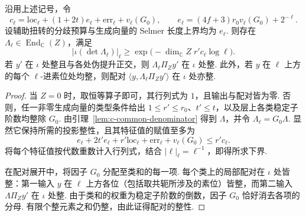 \begin{lemma}[分母算子的行列式与整配对]
\label{lem:c-clearing-determinant}
\emitthmsource
沿用上述记号，令
\begin{equation}
 c_\ell=\mathrm{loc}_\ell+(1+2t)e_\ell+\mathrm{err}_\ell+v_\ell(G_0),
 \qquad e_\ell=(4f+3)r_0v_\ell(G_0)+2^{-\ell}.
\label{eq:c-clearing-determinant}
\end{equation}
设辅助扭转的分歧预算与生成向量的 Selmer 长度上界均为 $e_\ell$.
则存在 $\Lambda_\ell\in\operatorname{End}_{\mathbb C}(Z)$，满足
\[
 |\iota(\det\Lambda_\ell)|_\ell
 \ge\exp\bigl(-\dim_{\mathbb C}Z\;r'c_\ell\log\ell\bigr).
\]
若 $y'$ 在 $\iota$ 处整且与各处伪提升正交，则 $\Lambda_\ell\Pi_Zy'$ 在 $\iota$ 处整.
此外，若 $y$ 在 $\ell$ 上方的每个 $\ell$-进素位处均整，则配对 $\langle y,\Lambda_\ell\Pi_Zy'\rangle$ 在 $\iota$ 处亦整.
\end{lemma}
\begin{proof}
当 $Z=0$ 时，取恒等算子即可，其行列式为 $1$，且输出与配对皆为零.
否则，任一非零生成向量的类型条件给出 $1\le r'\le r_0$、$t'\le t$，以及层上各类稳定子阶数均整除 $G_0$.
由引理~\ref{lem:c-common-denominator} 得到 $\Lambda$，并令 $\Lambda_\ell=G_0\Lambda$. 显然它保持所需的投影整性，且其特征值的赋值至多为
\[
 e_\ell+2t'e_\ell+r'\mathrm{loc}_\ell+\mathrm{err}_\ell+v_\ell(G_0)
 \le r'c_\ell .
\]
将每个特征值按代数重数计入行列式，结合 $|\ell|_\ell=\ell^{-1}$，即得所求下界.

在配对展开中，将因子 $G_0$ 分配至类和的每一项.
每个类上的局部配对在 $\iota$ 处皆整：第一输入 $y$ 在 $\ell$ 上方各位（包括取共轭所涉及的素位）皆整，而第二输入 $\Lambda\Pi_Zy'$ 在 $\iota$ 处整.
由于类和的权重为稳定子阶数的倒数，因子 $G_0$ 恰好消去各项的分母.
有限个整元素之和仍整，由此证得配对的整性.
\end{proof}

